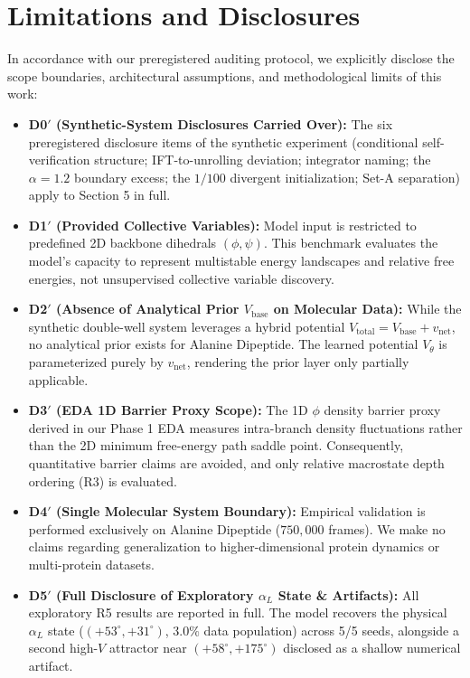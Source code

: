 \section{Limitations and Disclosures}
\label{sec:limitations}

In accordance with our preregistered auditing protocol, we explicitly disclose the scope boundaries, architectural assumptions, and methodological limits of this work:

\begin{itemize}
    \item \textbf{D0$'$ (Synthetic-System Disclosures Carried Over):} The six preregistered disclosure items of the synthetic experiment (conditional self-verification structure; IFT-to-unrolling deviation; integrator naming; the $\alpha=1.2$ boundary excess; the $1/100$ divergent initialization; Set-A separation) apply to Section 5 in full.
    \item \textbf{D1$'$ (Provided Collective Variables):} Model input is restricted to predefined 2D backbone dihedrals $(\phi, \psi)$. This benchmark evaluates the model's capacity to represent multistable energy landscapes and relative free energies, not unsupervised collective variable discovery.
    \item \textbf{D2$'$ (Absence of Analytical Prior $V_{\text{base}}$ on Molecular Data):} While the synthetic double-well system leverages a hybrid potential $V_{\text{total}} = V_{\text{base}} + v_{\text{net}}$, no analytical prior exists for Alanine Dipeptide. The learned potential $V_\theta$ is parameterized purely by $v_{\text{net}}$, rendering the prior layer only partially applicable.
    \item \textbf{D3$'$ (EDA 1D Barrier Proxy Scope):} The 1D $\phi$ density barrier proxy derived in our Phase 1 EDA measures intra-branch density fluctuations rather than the 2D minimum free-energy path saddle point. Consequently, quantitative barrier claims are avoided, and only relative macrostate depth ordering (R3) is evaluated.
    \item \textbf{D4$'$ (Single Molecular System Boundary):} Empirical validation is performed exclusively on Alanine Dipeptide ($750{,}000$ frames). We make no claims regarding generalization to higher-dimensional protein dynamics or multi-protein datasets.
    \item \textbf{D5$'$ (Full Disclosure of Exploratory $\alpha_L$ State \& Artifacts):} All exploratory R5 results are reported in full. The model recovers the physical $\alpha_L$ state ($(+\text{53}^\circ, +\text{31}^\circ)$, $3.0\%$ data population) across 5/5 seeds, alongside a second high-$V$ attractor near $(+\text{58}^\circ, +\text{175}^\circ)$ disclosed as a shallow numerical artifact.

\end{itemize}
